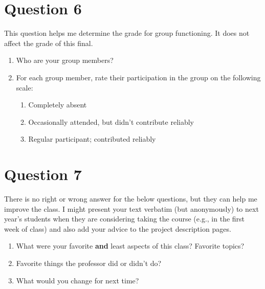 \documentclass[10pt]{article}
\begin{document}
\newpage
\section{Question 6}

This question helps me determine the grade for group functioning.  It does not affect the grade of this final.

\begin{enumerate}
\item Who are your group members?
\item For each group member, rate their participation in the group on the following scale:
  \begin{enumerate}
  \item Completely absent
  \item Occasionally attended, but didn't contribute reliably
  \item Regular participant; contributed reliably
  \end{enumerate}
\end{enumerate}



\newpage
\section{Question 7}


There is no right or wrong answer for the below questions, but they can help me improve the class. 
I might present your text verbatim (but anonymously) to next year's students when they are considering taking the course (e.g., in the first week of class) and also add your advice to the project description pages.

\begin{enumerate}
\item What were your favorite \textbf{and} least aspects of this class? Favorite topics?
\item Favorite things the professor did or didn't do?
\item What would you change for next time?
\end{enumerate}
\end{document}
